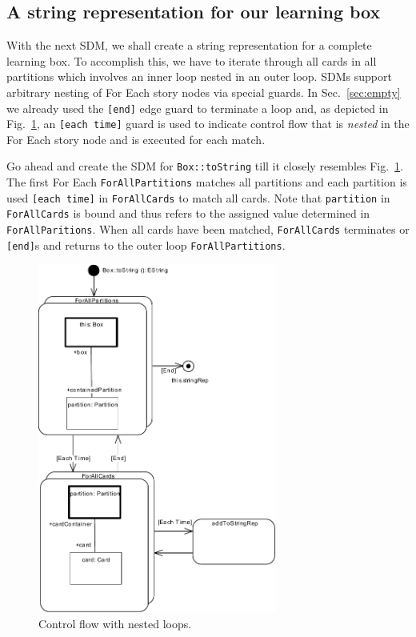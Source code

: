 \subsection{A string representation for our learning box}

With the next SDM, we shall create a string representation for a complete
learning box. To accomplish this, we have to iterate through all cards in all
partitions which involves an inner loop nested in an outer loop.  SDMs support arbitrary nesting
of For Each story nodes via special guards.  In Sec.~\ref{sec:empty} we already
used the \texttt{[end]} edge guard to terminate a loop and, as depicted in
Fig.~\ref{fig:sdm_tostring_1}, an \texttt{[each time]} guard is used to indicate
control flow that is \emph{nested} in the For Each story node and is executed
for each match.

Go ahead and create the SDM for \texttt{Box::toString} till it closely resembles
Fig.~\ref{fig:sdm_tostring_1}.  The first For Each \texttt{ForAllPartitions}
matches all partitions and each partition is used \texttt{[each time]} in
\texttt{ForAllCards} to match all cards.  Note that \texttt{partition} in
\texttt{ForAllCards} is bound  and thus refers to the assigned value determined
in \texttt{ForAllParitions}.  When all cards have been matched,
\texttt{ForAllCards} terminates or \texttt{[end]}s and returns to the outer loop
\texttt{ForAllPartitions}.

\begin{figure}[htbp]
\begin{center}
  \includegraphics[width=0.7\textwidth]{pics/sdmBilder/toString/sdm72.pdf}
  \caption{Control flow with nested loops.}  
  \label{fig:sdm_tostring_1}
\end{center}
\end{figure}

